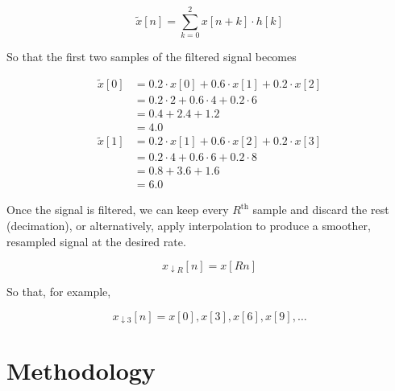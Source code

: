\documentclass[conference]{IEEEtran}
\begin{document}
$$\tilde{x}[n] = \sum_{k=0}^{2} x[n + k] \cdot h[k]$$

So that the first two samples of the filtered signal becomes

\begin{align*}
	\tilde{x}[0]	&= 0.2 \cdot x[0] + 0.6 \cdot x[1] + 0.2 \cdot x[2] \\
					&= 0.2\cdot2 + 0.6\cdot4 + 0.2\cdot6 \\
					&= 0.4 + 2.4 + 1.2 \\
					&= 4.0\\
	\tilde{x}[1] 	&= 0.2 \cdot x[1] + 0.6 \cdot x[2] + 0.2 \cdot x[3] \\
					&= 0.2\cdot4 + 0.6\cdot6 + 0.2\cdot8 \\
					&= 0.8 + 3.6 + 1.6 \\
					&= 6.0
\end{align*}

Once the signal is filtered, we can keep every $R^\text{th}$ sample and discard the rest (decimation), or alternatively, apply interpolation to produce a smoother, resampled signal at the desired rate.

$$x_{\downarrow R}[n] = x[Rn]$$

So that, for example,

$$x_{\downarrow 3}[n] = x[0], x[3], x[6], x[9], \dots$$







\section{Methodology}
\end{document}
